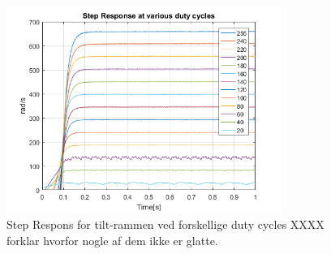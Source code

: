 \begin{figure}[!ht]
	\begin{center}
		\includegraphics[width=0.8\textwidth]{Billeder/RPM_vs_DC.png}
	\end{center}
	\caption{Step Respons for tilt-rammen ved forskellige duty cycles XXXX forklar hvorfor nogle af dem ikke er glatte.}
	\label{fig:RPM_DC}
\end{figure}